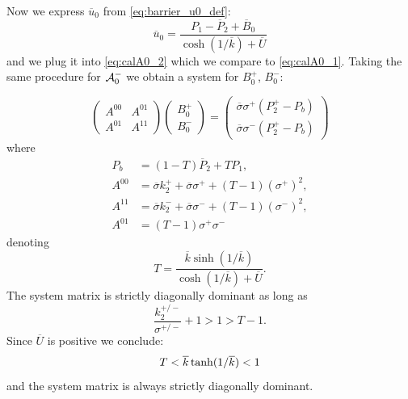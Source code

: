 \documentclass[a4paper,10pt]{article}
\def\ol#1{\overline{#1}}
\begin{document}
Now we express $\ol{u}_0$ from \eqref{eq:barrier_u0_def}:
\begin{equation}
    \label{eq:barrier_u0}
    \ol{u}_0 = \frac{P_1 - \ol{P}_2 + \ol{B}_0}{\cosh(1/\ol{k}) + \ol{U}}
\end{equation}
and we plug it into  \eqref{eq:calA0_2} which we compare to \eqref{eq:calA0_1}. Taking the same procedure for ${\cal A}_0^-$ we
obtain a system for $B_0^+$, $B_0^-$:

\begin{equation}
    \label{eq:an_system}
    \begin{pmatrix} 
            A^{00} & A^{01} \\ 
            A^{01} & A^{11}
    \end{pmatrix}
    \begin{pmatrix} 
        B_0^+  \\ 
        B_0^-     
    \end{pmatrix}
     =  
    \begin{pmatrix} 
        \ol{\sigma}\sigma^+(P^+_2 - P_b) \\ 
        \ol{\sigma}\sigma^-(P^+_2 - P_b)
    \end{pmatrix}
\end{equation}
where
\begin{align}
    \label{eq:B0_system_p}
    P_b &= (1-T) \ol{P}_2 + T P_1, \\
    A^{00} &= \ol{\sigma}k_2^+  + \ol{\sigma}\sigma^+ +(T-1)(\sigma^+)^2, \\
    A^{11} &= \ol{\sigma}k_2^-  + \ol{\sigma}\sigma^- +(T-1)(\sigma^-)^2, \\
    A^{01} &= (T-1)\sigma^+\sigma^-    
\end{align}
denoting
\[
    T  = \frac{\ol{k}\sinh( 1/\ol{k} )}{\cosh(1/\ol{k}) + \ol{U}}.
\]
The system matrix is strictly diagonally dominant as long as 
\[
    \frac{k_2^{+/-}}{\sigma^{+/-}} + 1 > 1 > T -1.
\]
Since $\ol{U}$ is positive we conclude:
\[
    T < \ol{k}\, {\rm tanh}( 1/\ol{k} ) < 1
\]
and the system matrix is always strictly diagonally dominant.


% 
% 
% 
% 
% 
\end{document}
